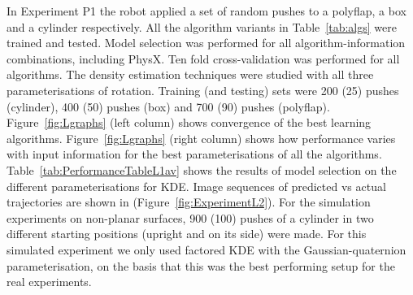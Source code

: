 In Experiment P1 the robot applied a set of random pushes to a
polyflap, a box and a cylinder respectively. All the algorithm
variants in Table~\ref{tab:algs} were trained and tested. Model
selection was performed for all algorithm-information combinations, including PhysX. Ten fold cross-validation was performed for all algorithms. The density estimation techniques were studied with all three parameterisations of rotation. Training (and testing) sets were 200 (25) pushes (cylinder), 400 (50) pushes (box) and 700 (90) pushes (polyflap). Figure~\ref{fig:Lgraphs} (left column) shows convergence of the best learning algorithms. Figure~\ref{fig:Lgraphs} (right column) shows how performance varies with input information for the best parameterisations of all the algorithms. Table~\ref{tab:PerformanceTableL1av} shows the results of model selection on the different parameterisations for KDE. Image sequences of predicted vs actual trajectories are shown in (Figure~\ref{fig:ExperimentL2}). For the simulation experiments on non-planar surfaces, 900 (100) pushes of a cylinder in two different starting positions (upright and on its side) were made. For this simulated experiment we only used factored KDE  with the Gaussian-quaternion parameterisation, on the basis that this was the best performing setup for the real experiments. 

